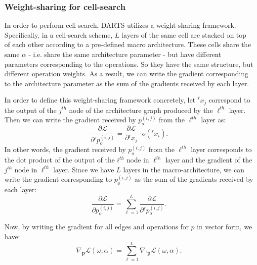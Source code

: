 \documentclass{article} \usepackage{fancyhdr, iclr2023_conference, times}
\def\vp{{\bm{p}}}
\begin{document}
\subsubsection{Weight-sharing for cell-search}
\par In order to perform cell-search, DARTS utilizes a weight-sharing framework. Specifically, in a cell-search scheme, $L$ layers of the same cell are stacked on top of each other according to a pre-defined macro architecture. These cells share the same $\alpha$ - i.e. share the same architecture parameter - but have different parameters corresponding to the operations. So they have the same structure, but different operation weights. As a result, we can write the gradient corresponding to the architecture parameter as the sum of the gradients received by each layer.
\par In order to define this weight-sharing framework concretely, let ${}^\ell x_j$ correspond to the output of the $j^{th}$ node of the architecture graph produced by the $\ell^{th}$ layer. Then we can write the gradient received by $p_{o}^{(i, j)}$ from the $\ell^{th}$ layer as:
\begin{equation}
    \label{eqn:archgrad-layerwise}
    \frac{\partial \mathcal{L}}{\partial {}^\ell p_{o}^{(i, j)}}=\frac{\partial \mathcal{L}}{\partial {}^\ell x_j}\cdot o({}^\ell x_i).
\end{equation}
In other words, the gradient received by $p_{o}^{(i, j)}$ from the $\ell^{th}$ layer corresponds to the dot product of the output of the $i^{th}$ node in $\ell^{th}$ layer and the gradient of the $j^{th}$ node in $\ell^{th}$ layer. Since we have $L$ layers in the macro-architecture, we can write the gradient corresponding to $p_{o}^{(i, j)}$ as the sum of the gradients received by each layer:
\begin{equation}
    \frac{\partial \mathcal{L}}{\partial p_{o}^{(i, j)}}=\sum_{\ell=1}^L \frac{\partial \mathcal{L}}{\partial {}^\ell p_{o}^{(i, j)}}.
\end{equation}
\par Now, by writing the gradient for all edges and operations for $p$ in vector form, we have:
\begin{equation}
    \nabla_\vp \mathcal{L}(\omega, \alpha)=\sum_{\ell=1}^L \nabla_{{}^\ell \vp} \mathcal{L}(\omega, \alpha).
\end{equation}
\end{document}
